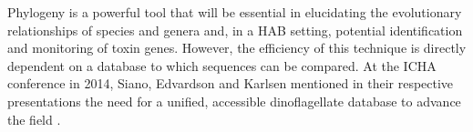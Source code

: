 \documentclass[12pt]{article}
\begin{document}
Phylogeny is a powerful tool that will be essential in elucidating the evolutionary relationships of species and genera and, in a HAB setting, potential identification and monitoring of toxin genes. However, the efficiency of this technique is directly dependent on a database to which sequences can be compared. At the ICHA conference in 2014, Siano, Edvardson and Karlsen mentioned in their respective presentations the need for a unified, accessible dinoflagellate database to advance the field \cite{sianoICHA,edvardsonICHA,karlsenICHA}.\\
\end{document}
